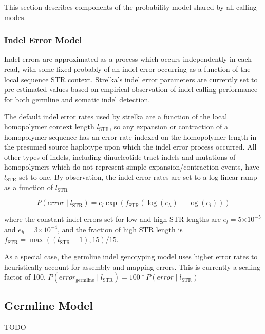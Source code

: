 \documentclass{article}
\newcommand{\e}[1]{\ensuremath{\times 10^{#1}}}
\begin{document}
This section describes components of the probability model shared by all calling modes.

\subsubsection{Indel Error Model}
\label{sec:indel_error}
Indel errors are approximated as a process which occurs independently in each read, with some fixed probably of an indel error occurring as a function of the local sequence STR context. Strelka's indel error parameters are currently set to pre-estimated values based on empirical observation of indel calling performance for both germline and somatic indel detection.

The default indel error rates used by strelka are a function of the local homopolymer context length $l_{\text{STR}}$, so any expansion or contraction of a homopolymer sequence has an error rate indexed on the homopolymer length in the presumed source haplotype upon which the indel error process occurred. All other types of indels, including dinucleotide tract indels and mutations of homopolymers which do not represent simple expansion/contraction events, have $l_{\text{STR}}$ set to one. By observation, the indel error rates are set to a log-linear ramp as a function of $l_{\text{STR}}$

\begin{equation*}
P(error \mid l_{\text{STR}}) = e_{l} \exp(f_{\text{STR}}(\log(e_{h})-\log(e_{l})))
\end{equation*}

\noindent where the constant indel errors set for low and high STR lengths are $e_{l} = 5\e{-5}$ and $e_{h} = 3\e{-4}$, and the fraction of high STR length is $f_{\text{STR}} = \max((l_{\text{STR}}-1),15)/15$.

As a special case, the germline indel genotyping model uses higher error rates to heuristically account for assembly and mapping errors. This is currently a scaling factor of 100, $P(error_{\text{germline}} \mid l_{\text{STR}}) = 100 * P(error \mid l_{\text{STR}})$


\subsection{Germline Model}


TODO

\end{document}
